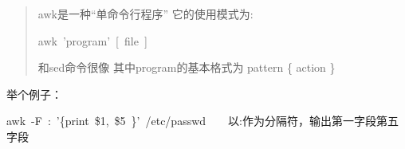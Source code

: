 \documentclass{article}
\begin{document}
\begin{quote}%

\noindent{}awk是一种“单命令行程序”\mdbr
{}它的使用模式为:%
\begin{mdpre}%
\noindent{}awk~'program'~{}[~file~]%
\end{mdpre}\noindent{}和sed命令很像\mdbr
{}其中program的基本格式为 pattern \{ action \}
\end{quote}%

\noindent{}举个例子：%
\begin{mdpre}%
\noindent{}awk~-F~:~'\{print~\$1,~\$5~\}'~/etc/passwd~~~~以:作为分隔符，输出第一字段第五字段%
\end{mdpre}%
\end{document}
